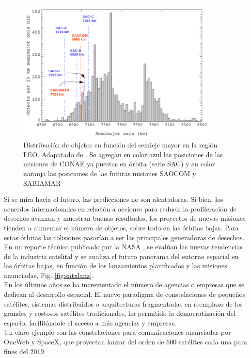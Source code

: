 \begin{figure}[!h]
  \centering
  \includegraphics[width=0.9\textwidth]{imagenes/SDvsaltura2011CONAE}
  \caption[Distribuci\'on de objetos en funci\'on del semieje mayor.]{Distribuci\'on de objetos en funci\'on del semieje mayor en la regi\'on LEO. Adapatado de \citep{Klinkrad}. Se agregan en color azul las posiciones de las misiones de CONAE ya puestas en \'orbita (serie SAC) y en color naranja las posiciones de las futuras misiones SAOCOM y SABIAMAR}
  \label{fig:Dvsaltura}
\end{figure}

Si se mira hacia el futuro, las predicciones no son alentadoras. Si bien, los acuerdos internacionales en relaci\'on a acciones para reducir la proliferaci\'on de desechos avanzan y muestran buenos resultados, los proyectos de nuevas misiones tienden a aumentar el n\'umero de objetos, sobre todo en las \'orbitas bajas. Para estas \'orbitas las colisiones pasar\'ian a ser las principales generadoras de desechos.\\

En un reporte t\'ecnico publicado por la NASA \citep{karacalioglu2016impact}, se eval\'uan las nuevas tendencias de la industria satelital y se analiza el futuro panorama del entorno espacial en las \'orbitas bajas, en funci\'on de los lanzamientos planificados y las misiones anunciadas, Fig. \ref{fig:satxlanz}.\\

En los \'ultimos a\~nos se ha incrementado el n\'umero de agencias o empresas que se dedican al desarrollo espacial. El nuevo paradigma de constelaciones de peque\~nos sat\'elites, sistemas distribuidos o arquitecturas fragmentadas en reemplazo de los grandes y costosos sat\'elites tradicionales, ha permitido la democratizaci\'on del espacio, facilit\'andole el acceso a m\'as agencias y empresas.\\ 
Un claro ejemplo son las constelaciones para comunicaciones anunciadas por OneWeb y SpaceX, que proyectan lanzar del orden de 600 sat\'elites cada una para fines del 2019.\\

